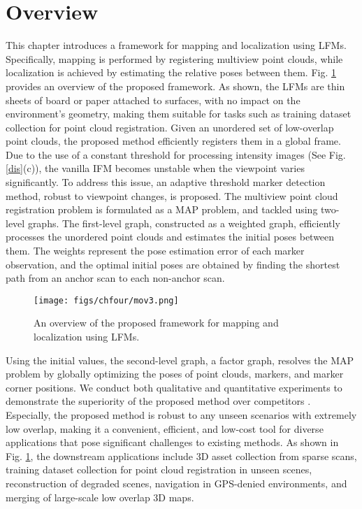 \section{Overview} \label{5.1}
This chapter introduces a framework for mapping and localization using LFMs. Specifically, mapping is performed by registering multiview point clouds, while localization is achieved by estimating the relative poses between them. Fig. \ref{mov2} provides an overview of the proposed framework. As shown, the LFMs are thin sheets of board or paper attached to surfaces, with no impact on the environment's geometry, making them suitable for tasks such as training dataset collection for point cloud registration. 
%
Given an unordered set of low-overlap point clouds, the proposed method efficiently registers them in a global frame. 
%
Due to the use of a constant threshold for processing intensity images (See Fig. \ref{dis}(c)), the vanilla IFM becomes unstable when the viewpoint varies significantly. To address this issue, an adaptive threshold marker detection method, robust to viewpoint changes, is proposed.
%
The multiview point cloud registration problem is formulated as a MAP problem, and tackled using two-level graphs.
%
The first-level graph, constructed as a weighted graph, efficiently processes the unordered point clouds and estimates the initial poses between them. The weights represent the pose estimation error of each marker observation, and the optimal initial poses are obtained by finding the shortest path from an anchor scan to each non-anchor scan.
\begin{figure}[H] 
	\centering
\texttt{[image: figs/chfour/mov3.png]}
	\caption{An overview of the proposed framework for mapping and localization using LFMs.}
	\label{mov2}
\end{figure}
Using the initial values, the second-level graph, a factor graph, resolves the MAP problem by globally optimizing the poses of point clouds, markers, and marker corner positions. We conduct both qualitative and quantitative experiments to demonstrate the superiority of the proposed method over competitors \cite{mdgd,sghr,se3et,geotransformer,teaser,qingdao,kiss}. Especially, the proposed method is robust to any unseen scenarios with extremely low overlap, making it a convenient, efficient, and low-cost tool for diverse applications that pose significant challenges to existing methods. As shown in Fig. \ref{mov2}, the downstream applications include 3D asset collection from sparse scans, training dataset collection for point cloud registration in unseen scenes, reconstruction of degraded scenes, navigation in GPS-denied environments, and merging of large-scale low overlap 3D maps.
%
